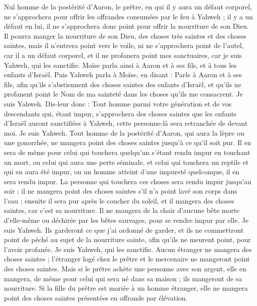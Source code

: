 \begin{multicols}{2}
Nul homme de la postérité d'Aaron, le prêtre, en qui il y aura un défaut corporel, ne s'approchera pour offrir les offrandes consumées par le feu à Yahweh ; il y a un défaut en lui, il ne s'approchera donc point pour offrir la nourriture de son Dieu.
Il pourra manger la nourriture de son Dieu, des choses très saintes et des choses saintes,
mais il n'entrera point vers le voile, ni ne s'approchera point de l'autel, car il a un défaut corporel, et il ne profanera point mes sanctuaires, car je suis Yahweh, qui les sanctifie.
Moïse parla ainsi à Aaron et à ses fils, et à tous les enfants d'Israël.
\VerseOne{}Puis Yahweh parla à Moïse, en disant :
Parle à Aaron et à ses fils, afin qu'ils s'abstiennent des choses saintes des enfants d'Israël, et qu'ils ne profanent point le Nom de ma sainteté dans les choses qu'ils me consacrent. Je suis Yahweh.
Dis-leur donc : Tout homme parmi votre génération et de vos descendants qui, étant impur, s'approchera des choses saintes que les enfants d'Israël auront sanctifiées à Yahweh, cette personne-là sera retranchée de devant moi. Je suis Yahweh.
Tout homme de la postérité d'Aaron, qui aura la lèpre ou une gonorrhée, ne mangera point des choses saintes jusqu'à ce qu'il soit pur. Il en sera de même pour celui qui touchera quelqu'un s'étant rendu impur en touchant un mort, ou celui qui aura une perte séminale,
et celui qui touchera un reptile et qui en aura été impur, ou un homme atteint d'une impureté quelconque, il en sera rendu impur.
La personne qui touchera ces choses sera rendu impur jusqu'au soir ; il ne mangera point des choses saintes s'il n'a point lavé son corps dans l'eau ;
ensuite il sera pur après le coucher du soleil, et il mangera des choses saintes, car c'est sa nourriture.
Il ne mangera de la chair d'aucune bête morte d'elle-même ou déchirée par les bêtes sauvages, pour se rendre impur par elle. Je suis Yahweh.
Ils garderont ce que j'ai ordonné de garder, et ils ne commettront point de péché au sujet de la nourriture sainte, afin qu'ils ne meurent point, pour l'avoir profanée. Je suis Yahweh, qui les sanctifie.
Aucun étranger ne mangera des choses saintes ; l'étranger logé chez le prêtre et le mercenaire ne mangeront point des choses saintes.
Mais si le prêtre achète une personne avec son argent, elle en mangera, de même pour celui qui sera né dans sa maison ; ils mangeront de sa nourriture.
Si la fille du prêtre est mariée à un homme étranger, elle ne mangera point des choses saintes présentées en offrande par élévation.

\end{multicols}
